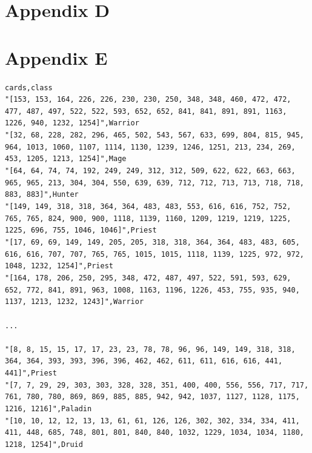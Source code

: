 \documentclass{report} %
\begin{document}
\section{Appendix D}


\section{Appendix E}
\texttt{cards,class\\
"[153, 153, 164, 226, 226, 230, 230, 250, 348, 348, 460, 472, 472, 477, 487, 497, 522, 522, 593, 652, 652, 841, 841, 891, 891, 1163, 1226, 940, 1232, 1254]",Warrior\\
"[32, 68, 228, 282, 296, 465, 502, 543, 567, 633, 699, 804, 815, 945, 964, 1013, 1060, 1107, 1114, 1130, 1239, 1246, 1251, 213, 234, 269, 453, 1205, 1213, 1254]",Mage\\
"[64, 64, 74, 74, 192, 249, 249, 312, 312, 509, 622, 622, 663, 663, 965, 965, 213, 304, 304, 550, 639, 639, 712, 712, 713, 713, 718, 718, 883, 883]",Hunter\\
"[149, 149, 318, 318, 364, 364, 483, 483, 553, 616, 616, 752, 752, 765, 765, 824, 900, 900, 1118, 1139, 1160, 1209, 1219, 1219, 1225, 1225, 696, 755, 1046, 1046]",Priest\\
"[17, 69, 69, 149, 149, 205, 205, 318, 318, 364, 364, 483, 483, 605, 616, 616, 707, 707, 765, 765, 1015, 1015, 1118, 1139, 1225, 972, 972, 1048, 1232, 1254]",Priest\\
"[164, 178, 206, 250, 295, 348, 472, 487, 497, 522, 591, 593, 629, 652, 772, 841, 891, 963, 1008, 1163, 1196, 1226, 453, 755, 935, 940, 1137, 1213, 1232, 1243]",Warrior\\ \\
...\\ \\
"[8, 8, 15, 15, 17, 17, 23, 23, 78, 78, 96, 96, 149, 149, 318, 318, 364, 364, 393, 393, 396, 396, 462, 462, 611, 611, 616, 616, 441, 441]",Priest\\
"[7, 7, 29, 29, 303, 303, 328, 328, 351, 400, 400, 556, 556, 717, 717, 761, 780, 780, 869, 869, 885, 885, 942, 942, 1037, 1127, 1128, 1175, 1216, 1216]",Paladin\\
"[10, 10, 12, 12, 13, 13, 61, 61, 126, 126, 302, 302, 334, 334, 411, 411, 448, 685, 748, 801, 801, 840, 840, 1032, 1229, 1034, 1034, 1180, 1218, 1254]",Druid\\
}
\end{document}

